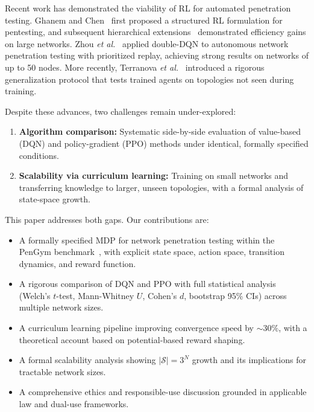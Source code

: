 \documentclass[conference]{IEEEtran}
\begin{document}
Recent work has demonstrated the viability of RL for automated
penetration testing.  Ghanem and Chen~\cite{ghanem2020reinforcement}
first proposed a structured RL formulation for pentesting, and
subsequent hierarchical extensions~\cite{ghanem2023jiis} demonstrated
efficiency gains on large networks.  Zhou \emph{et
al.}~\cite{zhou2021autonomous} applied double-DQN to autonomous network
penetration testing with prioritized replay, achieving strong results on
networks of up to 50 nodes.  More recently, Terranova \emph{et
al.}~\cite{terranova2024raid} introduced a rigorous generalization
protocol that tests trained agents on topologies not seen during
training.

Despite these advances, two challenges remain under-explored:
\begin{enumerate}[noitemsep]
  \item \textbf{Algorithm comparison:}  Systematic side-by-side
        evaluation of value-based (DQN) and policy-gradient (PPO)
        methods under identical, formally specified conditions.
  \item \textbf{Scalability via curriculum learning:}  Training on
        small networks and transferring knowledge to larger, unseen
        topologies, with a formal analysis of state-space growth.
\end{enumerate}

This paper addresses both gaps.  Our contributions are:
\begin{itemize}[noitemsep]
  \item A formally specified MDP for network penetration testing
        within the PenGym benchmark~\cite{nguyen2025cose}, with explicit state space, action space, transition dynamics,
        and reward function.
  \item A rigorous comparison of DQN and PPO with full statistical
        analysis (Welch's $t$-test, Mann-Whitney $U$, Cohen's $d$,
        bootstrap 95\% CIs) across multiple network sizes.
  \item A curriculum learning pipeline improving convergence speed
        by ${\sim}30\%$, with a theoretical account based on
        potential-based reward shaping.
  \item A formal scalability analysis showing $|\mathcal{S}| = 3^N$
        growth and its implications for tractable network sizes.
  \item A comprehensive ethics and responsible-use discussion
        grounded in applicable law and dual-use frameworks.
\end{itemize}
\end{document}
